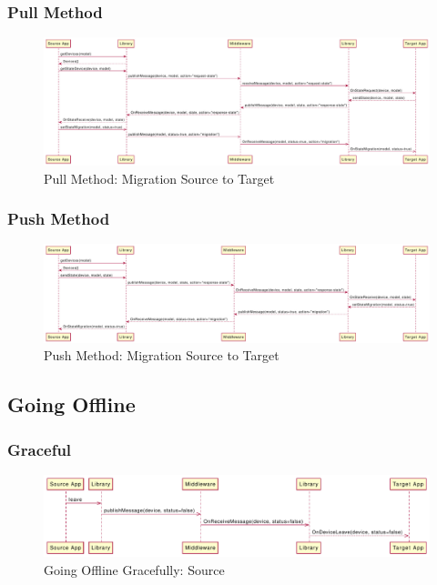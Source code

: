 \subsubsection{Pull Method}
\begin{figure}
    \includegraphics[width=\linewidth]{../figures/Migration-Source-to-Target-Pull-Method}
    \centering
    \caption{Pull Method: Migration Source to Target}
    \label{fig:Migration-Source-to-Target-Pull-Method}
\end{figure}

\subsubsection{Push Method}
\begin{figure}
    \includegraphics[width=\linewidth]{../figures/Migration-Source-to-Target-Push-Method}
    \centering
    \caption{Push Method: Migration Source to Target}
    \label{fig:Migration-Source-to-Target-Push-Method}
\end{figure}

\subsection{Going Offline}
\subsubsection{Graceful}
\begin{figure}
    \includegraphics[width=\linewidth]{../figures/Going-Offline-Graceful-Source}
    \centering
    \caption{Going Offline Gracefully: Source}
    \label{fig:Going-Offline-Graceful-Source}
\end{figure}
